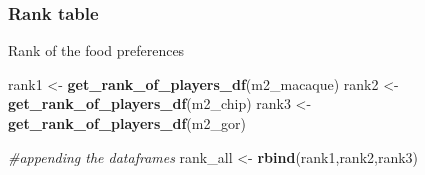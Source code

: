 \documentclass[
]{book}
\newenvironment{Shaded}{\begin{snugshade}}{\end{snugshade}}
\newcommand{\CommentTok}[1]{\textcolor[rgb]{0.56,0.35,0.01}{\textit{#1}}}
\newcommand{\KeywordTok}[1]{\textcolor[rgb]{0.13,0.29,0.53}{\textbf{#1}}}
\newcommand{\NormalTok}[1]{#1}
\newcommand{\StringTok}[1]{\textcolor[rgb]{0.31,0.60,0.02}{#1}}
\begin{document}
\hypertarget{rank-table}{%
\subsubsection{Rank table}\label{rank-table}}

Rank of the food preferences

\begin{Shaded}
\begin{Highlighting}[]
\NormalTok{rank1 <-}\StringTok{ }\KeywordTok{get_rank_of_players_df}\NormalTok{(m2_macaque)}
\NormalTok{rank2 <-}\StringTok{ }\KeywordTok{get_rank_of_players_df}\NormalTok{(m2_chip)}
\NormalTok{rank3 <-}\StringTok{ }\KeywordTok{get_rank_of_players_df}\NormalTok{(m2_gor)}

\CommentTok{#appending the dataframes}
\NormalTok{rank_all <-}\StringTok{ }\KeywordTok{rbind}\NormalTok{(rank1,rank2,rank3)}


\end{Highlighting}
\end{Shaded}
\end{document}
